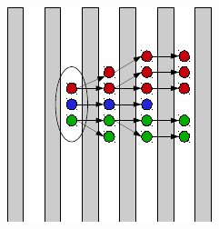 \documentclass[8pt]{beamer}
\begin{document}
\begin{frame}
\begin{minipage}{0.44\linewidth}
\begin{center}
        ~ \\
        \includegraphics[width=0.5\linewidth]{NeutralTreeMerging.pdf}
      \end{center}
    \end{minipage}
  \end{frame}
  
\end{document}
